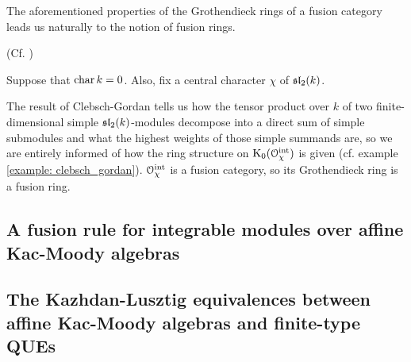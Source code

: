             The aforementioned properties of the Grothendieck rings of a fusion category leads us naturally to the notion of fusion rings.
            \begin{definition}
                (Cf. \cite[Subsection 3.1]{EGNO})
            \end{definition}
            \begin{example}
                Suppose that $\chara k = 0$. Also, fix a central character $\chi$ of $\sl_2(k)$.
            
                The result of Clebsch-Gordan tells us how the tensor product over $k$ of two finite-dimensional simple $\sl_2(k)$-modules decompose into a direct sum of simple submodules and what the highest weights of those simple summands are, so we are entirely informed of how the ring structure on $\K_0(\calO_{\chi}^{\integrable})$ is given (cf. example \ref{example: clebsch_gordan}). $\calO_{\chi}^{\integrable}$ is a fusion category, so its Grothendieck ring is a fusion ring.
                
            \end{example}

        \subsection{A fusion rule for integrable modules over affine Kac-Moody algebras}

        \subsection{The Kazhdan-Lusztig equivalences between affine Kac-Moody algebras and finite-type QUEs}
    
    \printbibliography

